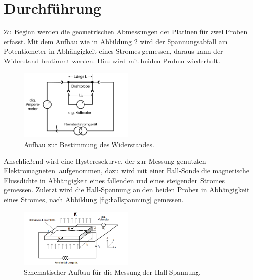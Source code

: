\newpage
\section{Durchführung}
\label{sec:Durchführung}
Zu Beginn werden die geometrischen Abmessungen der Platinen für zwei Proben erfasst.
Mit dem Aufbau wie in Abbildung \ref{fig:widerstand} wird der Spannungsabfall am Potentiometer in Abhängigkeit eines Stromes gemessen, daraus kann
der Widerstand bestimmt werden. Dies wird mit beiden Proben wiederholt.
\begin{figure}
  \centering
  \includegraphics[width=0.5\textwidth]{widerstand.PNG}
  \caption{Aufbau zur Bestimmung des Widerstandes.\cite{sample}}
  \label{fig:widerstand}
\end{figure}
\FloatBarrier
Anschließend wird eine Hysteresekurve, der zur Messung genutzten Elektromagneten, aufgenommen, dazu wird mit einer Hall-Sonde die magnetische Flussdichte in Abhängigkeit
eines fallenden und eines steigenden Stromes gemessen.
Zuletzt wird die Hall-Spannung an den beiden Proben in Abhängigkeit eines Stromes, nach Abbildung
\ref{fig:hallspannung} gemessen.
\begin{figure}
  \centering
  \includegraphics[width=0.5\textwidth]{hall.PNG}
  \caption{Schematischer Aufbau für die Messung der Hall-Spannung.\cite{sample}}
  \label{fig:widerstand}
\end{figure}
\FloatBarrier
